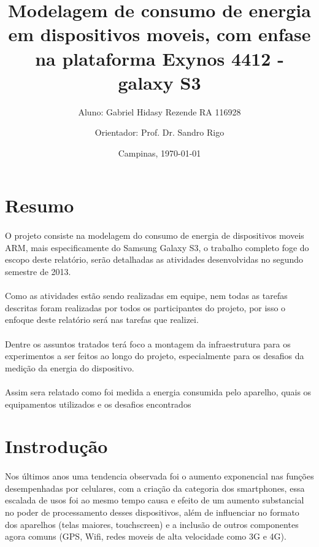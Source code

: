 \documentclass[11pt,a4paper,titlepage]{article}
\title{Modelagem de consumo de energia em dispositivos moveis, com enfase na plataforma Exynos 4412 - galaxy S3}
\author{Aluno: Gabriel Hidasy Rezende RA 116928 \and Orientador: Prof. Dr. Sandro Rigo}
\date{Campinas, \today}
\begin{document}
\maketitle

\tableofcontents
\newpage

\section{Resumo}
\paragraph{} O projeto consiste na modelagem do consumo de energia de dispositivos moveis ARM, mais especificamente do Samsung Galaxy S3, o trabalho completo foge do escopo deste relatório, serão detalhadas as atividades desenvolvidas no segundo semestre de 2013.
\paragraph{} Como as atividades estão sendo realizadas em equipe, nem todas as tarefas descritas foram realizadas por todos os participantes do projeto, por isso o enfoque deste relatório será nas tarefas que realizei.
\paragraph{} Dentre os assuntos tratados terá foco a montagem da infraestrutura para os experimentos a ser feitos ao longo do projeto, especialmente para os desafios da medição da energia do dispositivo.
\paragraph{} Assim sera relatado como foi medida a energia consumida pelo aparelho, quais os equipamentos utilizados e os desafios encontrados
\section{Instrodução}
\paragraph{} Nos últimos anos uma tendencia observada foi o aumento exponencial nas funções desempenhadas por celulares, com a criação da categoria dos smartphones, essa escalada de usos foi ao mesmo tempo causa e efeito de um aumento substancial no poder de processamento desses dispositivos, além de influenciar no formato dos aparelhos (telas maiores, touchscreen) e a inclusão de outros componentes agora comuns (GPS, Wifi, redes moveis de alta velocidade como 3G e 4G).
\end{document}
